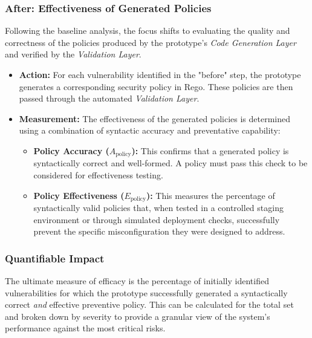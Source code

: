 \subsubsection*{After: Effectiveness of Generated Policies}
Following the baseline analysis, the focus shifts to evaluating the quality and correctness of the policies produced by the prototype's \textit{Code Generation Layer} and verified by the \textit{Validation Layer}.

\begin{itemize}
    \item \textbf{Action:} For each vulnerability identified in the "before" step, the prototype generates a corresponding security policy in Rego. These policies are then passed through the automated \textit{Validation Layer}.
    \item \textbf{Measurement:} The effectiveness of the generated policies is determined using a combination of syntactic accuracy and preventative capability:
        \begin{itemize}
            \item \textbf{Policy Accuracy ($A_{\text{policy}}$):} This confirms that a generated policy is syntactically correct and well-formed. A policy must pass this check to be considered for effectiveness testing.
            \item \textbf{Policy Effectiveness ($E_{\text{policy}}$):} This measures the percentage of syntactically valid policies that, when tested in a controlled staging environment or through simulated deployment checks, successfully prevent the specific misconfiguration they were designed to address.
        \end{itemize}
\end{itemize}

\subsubsection*{Quantifiable Impact}
The ultimate measure of efficacy is the percentage of initially identified vulnerabilities for which the prototype successfully generated a syntactically correct \textit{and} effective preventive policy. This can be calculated for the total set and broken down by severity to provide a granular view of the system's performance against the most critical risks.


